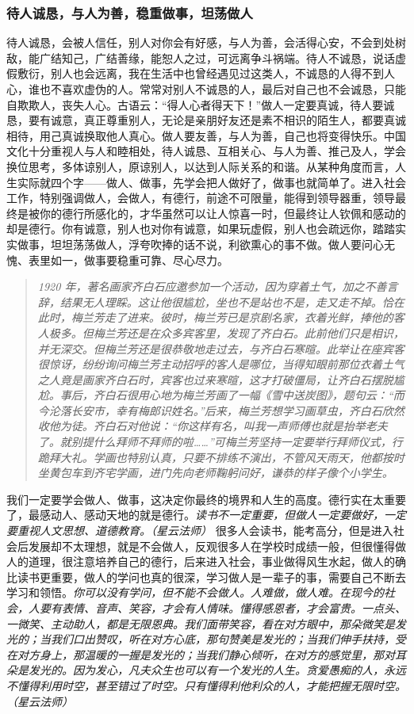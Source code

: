 \subsubsection{待人诚恳，与人为善，稳重做事，坦荡做人}

待人诚恳，会被人信任，别人对你会有好感，与人为善，会活得心安，不会到处树敌，能广结知己，广结善缘，能恕人之过，可远离争斗祸端。待人不诚恳，说话虚假敷衍，别人也会远离，我在生活中也曾经遇见过这类人，不诚恳的人得不到人心，谁也不喜欢虚伪的人。常常对别人不诚恳的人，最后对自己也不会诚恳，只能自欺欺人，丧失人心。古语云：“得人心者得天下！”做人一定要真诚，待人要诚恳，要有诚意，真正尊重别人，无论是亲朋好友还是素不相识的陌生人，都要真诚相待，用己真诚换取他人真心。做人要友善，与人为善，自己也将变得快乐。中国文化十分重视人与人和睦相处，待人诚恳、互相关心、与人为善、推己及人，学会换位思考，多体谅别人，原谅别人，以达到人际关系的和谐。从某种角度而言，人生实际就四个字——做人、做事，先学会把人做好了，做事也就简单了。进入社会工作，特别强调做人，会做人，有德行，前途不可限量，能得到领导器重，领导最终是被你的德行所感化的，才华虽然可以让人惊喜一时，但最终让人钦佩和感动的却是德行。你有诚意，别人也对你有诚意，如果玩虚假，别人也会疏远你，踏踏实实做事，坦坦荡荡做人，浮夸吹捧的话不说，利欲熏心的事不做。做人要问心无愧、表里如一，做事要稳重可靠、尽心尽力。

\begin{quote}\it
    1920 年，著名画家齐白石应邀参加一个活动，因为穿着土气，加之不善言辞，结果无人理睬。这让他很尴尬，坐也不是站也不是，走又走不掉。恰在此时，梅兰芳走了进来。彼时，梅兰芳已是京剧名家，衣着光鲜，捧他的客人极多。但梅兰芳还是在众多宾客里，发现了齐白石。此前他们只是相识，并无深交。但梅兰芳还是很恭敬地走过去，与齐白石寒暄。此举让在座宾客很惊讶，纷纷询问梅兰芳主动招呼的客人是哪位，当得知眼前那位衣着土气之人竟是画家齐白石时，宾客也过来寒暄，这才打破僵局，让齐白石摆脱尴尬。事后，齐白石很用心地为梅兰芳画了一幅《雪中送炭图》，题句云：“而今沦落长安市，幸有梅郎识姓名。”后来，梅兰芳想学习画草虫，齐白石欣然收他为徒。齐白石对他说：“你这样有名，叫我一声师傅也就是抬举老夫了。就别提什么拜师不拜师的啦……”可梅兰芳坚持一定要举行拜师仪式，行跪拜大礼。学画也特别认真，只要不排练不演出，不管风天雨天，他都按时坐黄包车到齐宅学画，进门先向老师鞠躬问好，谦恭的样子像个小学生。
\end{quote}

我们一定要学会做人、做事，这决定你最终的境界和人生的高度。德行实在太重要了，最感动人、感动天地的就是德行。\textit{读书不一定重要，但做人一定要做好，一定要重视人文思想、道德教育。（星云法师）} 很多人会读书，能考高分，但是进入社会后发展却不太理想，就是不会做人，反观很多人在学校时成绩一般，但很懂得做人的道理，很注意培养自己的德行，后来进入社会，事业做得风生水起，做人的确比读书更重要，做人的学问也真的很深，学习做人是一辈子的事，需要自己不断去学习和领悟。\textit{你可以没有学问，但不能不会做人。人难做，做人难。在现今的社会，人要有表情、音声、笑容，才会有人情味。懂得感恩者，才会富贵。一点头、一微笑、主动助人，都是无限恩典。我们面带笑容，看在对方眼中，那朵微笑是发光的；当我们口出赞叹，听在对方心底，那句赞美是发光的；当我们伸手扶持，受在对方身上，那温暖的一握是发光的；当我们静心倾听，在对方的感觉里，那对耳朵是发光的。因为发心，凡夫众生也可以有一个发光的人生。贪爱愚痴的人，永远不懂得利用时空，甚至错过了时空。只有懂得利他利众的人，才能把握无限时空。（星云法师）}

